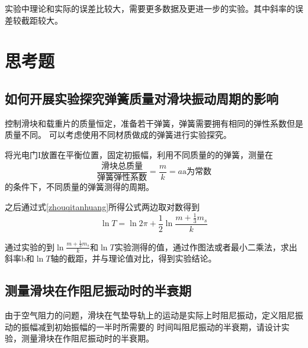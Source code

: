 \documentclass{ctexart}
\begin{document}
  实验中理论和实际的误差比较大，需要更多数据及更进一步的实验。其中斜率的误差较截距较大。
\newpage

\section{思考题}
  \subsection{如何开展实验探究弹簧质量对滑块振动周期的影响}
  控制滑块和载重片的质量恒定，准备若干弹簧，弹簧需要拥有相同的弹性系数但是质量不同。
  可以考虑使用不同材质做成的弹簧进行实验探究。

  将光电门I放置在平衡位置，固定初振幅，利用不同质量的的弹簧，测量在
  \begin{equation}
    \frac{\mbox{滑块总质量}}{\mbox{弹簧弹性系数}}=\frac{m}{k}=a\mbox{a为常数}
  \end{equation}
  的条件下，不同质量的弹簧测得的周期。
  
  之后通过式\ref{zhouqitanhuang}所得公式两边取对数得到
  \begin{equation}
    \ln T=\ln 2\pi + \frac{1}{2} \ln \frac{m+\frac{1}{3}m_{s}}{k}
  \end{equation}
  
  通过实验的到$\ln \frac{m+\frac{1}{3}m_{s}}{k}$和$\ln T$实验测得的值，通过作图法或者最小二乘法，求出
  斜率b和$\ln T$轴的截距，并与理论值对比，得到实验结论。
  \subsection{测量滑块在作阻尼振动时的半衰期}

  由于空气阻力的问题，滑块在气垫导轨上的运动是实际上时阻尼振动，定义阻尼振动的振幅减到初始振幅的一半时所需要的
  时间叫阻尼振动的半衰期，请设计实验，测量滑块在作阻尼振动时的半衰期。
\end{document}
